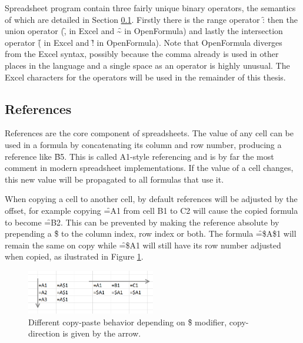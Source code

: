 Spreadsheet program contain three fairly unique binary operators, the semantics of which are detailed in Section \ref{sec:references}.
Firstly there is the range operator \f{:} then the union operator (\f{,} in Excel and \f{\textasciitilde} in OpenFormula) and lastly the intersection operator (\f{} in Excel and \f{!} in OpenFormula).
Note that OpenFormula diverges from the Excel syntax, possibly because the comma already is used in other places in the language and a single space as an operator is highly unusual.
The Excel characters for the operators will be used in the remainder of this thesis.

\subsection{References}
\label{sec:references}
References are the core component of spreadsheets.
The value of any cell can be used in a formula by concatenating its column and row number, producing a reference like \f{B5}.
This is called A1-style referencing and is by far the most comment in modern spreadsheet implementations.
If the value of a cell changes, this new value will be propagated to all formulas that use it.

When copying a cell to another cell, by default references will be adjusted by the offset, for example copying \f{=A1} from cell B1 to C2 will cause the copied formula to become \f{=B2}.
This can be prevented by making the reference absolute by prepending a \f{\$} to the column index, row index or both.
The formula \f{=\$A\$1} will remain the same on copy while \f{=\$A1} will still have its row number adjusted when copied, as ilustrated in Figure \ref{fig:copy-modifiers}.

\begin{figure}
\centerfloat
\includegraphics[width=0.5\textwidth]{anatomy/copying}
\caption{Different copy-paste behavior depending on \f{\$} modifier, copy-direction is given by the arrow.}
\label{fig:copy-modifiers}
\end{figure}


